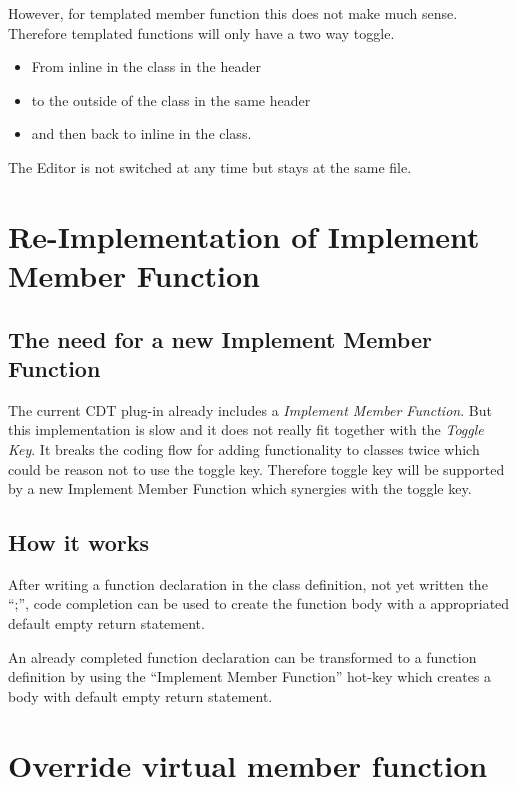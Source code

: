 However, for templated member function this does not make much sense. Therefore
templated functions will only have a two way toggle.
\begin{itemize}
 \item From inline in the class in the header
 \item to the outside of the class in the same header
 \item and then back to inline in the class.
\end{itemize}

The Editor is not switched at any time but stays at the same file.

\section{Re-Implementation of Implement Member Function}

\subsection{The need for a new Implement Member Function}

The current CDT plug-in already includes a \textit{Implement Member
Function}. But this implementation is slow and it does not really
fit together with the \textit{Toggle Key}. It breaks the coding
flow for adding functionality to classes twice which could be reason not to use
the toggle key. Therefore toggle key will be supported by a new
Implement Member Function which synergies with the toggle key.

\subsection{How it works}

After writing a function declaration in the class definition, not yet written
the ``;'', code completion can be used to create the function body with a
appropriated default empty return statement.\newline

An already completed function declaration can be transformed to a function
definition by using the ``Implement Member Function'' hot-key which creates a
body with default empty return statement.

\section{Override virtual member function}
